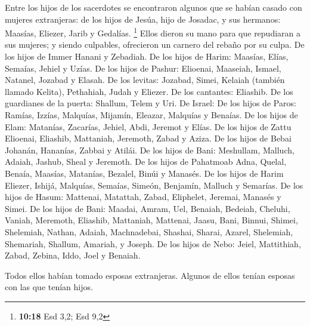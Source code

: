  Entre los hijos de los sacerdotes se encontraron algunos
que se habían casado con mujeres extranjeras: de los hijos de Jesúa,
hijo de Josadac, y sus hermanos: Maasías, Eliezer, Jarib y Gedalías.
\footnote{\textbf{10:18} Esd 3,2; Esd 9,2}  Ellos dieron
su mano para que repudiaran a sus mujeres; y siendo culpables,
ofrecieron un carnero del rebaño por su culpa.  De los
hijos de Immer Hanani y Zebadiah.  De los hijos de Harim:
Maasías, Elías, Semaías, Jehiel y Uzías.  De los hijos de
Pashur: Elioenai, Maaseiah, Ismael, Natanel, Jozabad y Elasah.
 De los levitas: Jozabad, Simei, Kelaiah (también llamado
Kelita), Pethahiah, Judah y Eliezer.  De los cantantes:
Eliashib. De los guardianes de la puerta: Shallum, Telem y Uri.
 De Israel: De los hijos de Paros: Ramías, Izzías,
Malquías, Mijamín, Eleazar, Malquías y Benaías.  De los
hijos de Elam: Matanías, Zacarías, Jehiel, Abdi, Jeremot y Elías.
 De los hijos de Zattu Elioenai, Eliashib, Mattaniah,
Jeremoth, Zabad y Aziza.  De los hijos de Bebai Johanán,
Hananías, Zabbai y Atilái.  De los hijos de Bani:
Meshullam, Malluch, Adaiah, Jashub, Sheal y Jeremoth.  De
los hijos de Pahatmoab Adna, Quelal, Benaía, Maasías, Matanías, Bezalel,
Binúi y Manasés.  De los hijos de Harim Eliezer, Ishijá,
Malquías, Semaías, Simeón,  Benjamín, Malluch y Semarías.
 De los hijos de Hasum: Mattenai, Matattah, Zabad,
Eliphelet, Jeremai, Manasés y Simei.  De los hijos de
Bani: Maadai, Amram, Uel,  Benaiah, Bedeiah, Cheluhi,
 Vaniah, Meremoth, Eliashib,  Mattaniah,
Mattenai, Jaasu,  Bani, Binnui, Shimei, 
Shelemiah, Nathan, Adaiah,  Machnadebai, Shashai, Sharai,
 Azarel, Shelemiah, Shemariah,  Shallum,
Amariah, y Joseph.  De los hijos de Nebo: Jeiel,
Mattithiah, Zabad, Zebina, Iddo, Joel y Benaiah.

 Todos ellos habían tomado esposas extranjeras. Algunos
de ellos tenían esposas con las que tenían hijos.

